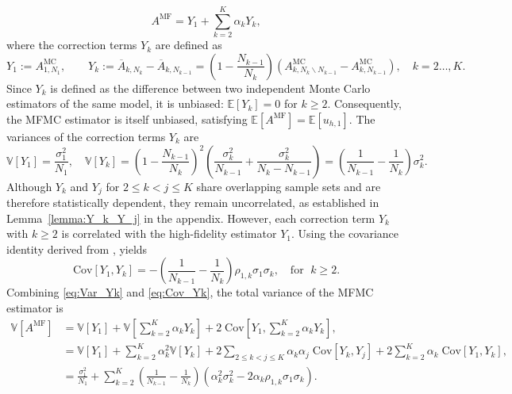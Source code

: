 %
\begin{equation*}\label{eq:MFMC_estimator_Correction}
A^{\text{MF}} = Y_1 + \sum_{k=2}^K \alpha_k Y_k,
\end{equation*}
%
where the correction terms $Y_k$ are defined as
%
\begin{equation} \label{eq:MFMC_Yk}
Y_1 :=A^{\text{MC}}_{1,N_1},\qquad Y_k:=\overline{A}_{k,N_k} - \overline{A}_{k,N_{k-1}}=\left(1-\frac{N_{k-1}}{N_{k}}\right)\left(A_{k,N_k\backslash N_{k-1}}^{\text{MC}}-A_{k,N_{k-1}}^{\text{MC}}\right), \quad k=2\ldots, K.
\end{equation}
%
Since $Y_k$ is defined as the difference between two independent Monte Carlo estimators of the same model, it is unbiased: $\mathbb{E}[Y_k] = 0$ for $k\ge 2$. Consequently, the MFMC estimator is itself unbiased, satisfying $\mathbb{E}[A^{\text{MF}}] = \mathbb{E}[u_{h,1}]$. The variances of the correction terms $Y_k$ are
%
\begin{equation}\label{eq:Var_Yk}
    \mathbb{V}\left[Y_1\right] = \frac{\sigma_1^2}{N_1}, \quad \mathbb{V}\left[Y_k\right] = \left(1-\frac{N_{k-1}}{N_{k}}\right)^2\left(\frac{\sigma_k^2}{N_{k-1}}+\frac{\sigma_k^2}{N_k-N_{k-1}}\right) = \left(\frac{1}{N_{k-1}} - \frac{1}{N_k}\right)\sigma_k^2.
\end{equation}
%
Although $Y_k$ and $Y_j$ for $2\le k<j \le K$ share overlapping sample sets and are therefore statistically dependent, they remain uncorrelated, as established in Lemma~\ref{lemma:Y_k_Y_j} in the appendix. However, each correction term $Y_k$ with $k\ge 2$ is correlated with the high-fidelity estimator $Y_1$. Using the covariance identity derived from \cite[Lemma~3.2]{PeWiGu:2016}, yields
%
\begin{equation}\label{eq:Cov_Yk}
\text{Cov}[Y_1,Y_k] = - \left(\frac{1}{N_{k-1}} - \frac{1}{N_k}\right)\rho_{1,k}\sigma_1\sigma_k, \quad \text{for } \; k\ge 2.
\end{equation}
%
Combining \eqref{eq:Var_Yk} and \eqref{eq:Cov_Yk}, the total variance of the MFMC estimator is 
%
\begin{align}
    \nonumber
    \mathbb{V}\left[A^{\text{MF}}\right] &= \mathbb{V}\left[Y_1\right] + \mathbb{V}\left[\sum_{k=2}^K \alpha_kY_k\right]+2\;\text{Cov}\left[Y_1,\sum_{k=2}^K \alpha_k Y_k \right],\\
    \nonumber
    &=\mathbb{V}\left[Y_1\right] + \sum_{k=2}^K \alpha_k^2 \mathbb{V}\left[Y_k\right]+2\sum_{2\le k<j\le K} \alpha_k\alpha_j\; \text{Cov}[Y_k,Y_j] +2\sum_{k=2}^K \alpha_k\;\text{Cov}\left[Y_1, Y_k\right],\\
    \label{eq:MFMC_variance}
    &=\frac{\sigma_1^2}{N_1} + \sum_{k=2}^K \left(\frac{1}{N_{k-1}} - \frac{1}{N_k}\right)\left(\alpha_k^2\sigma_k^2 - 2\alpha_k\rho_{1,k}\sigma_1\sigma_k\right).
\end{align}
